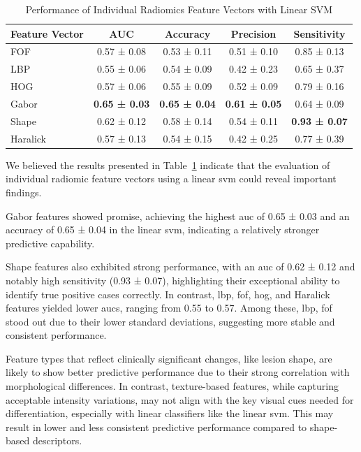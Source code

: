\begin{table}[ht]
    \centering
    \caption{Performance of Individual Radiomics Feature Vectors with Linear SVM}
    \label{tab:svm_feature_vectors}
    \begin{tabular}{lcccc}
        \toprule
        \textbf{Feature Vector} & \textbf{AUC} & \textbf{Accuracy} & \textbf{Precision} & \textbf{Sensitivity} \\
        \midrule
        FOF             & 0.57 ± 0.08 & 0.53 ± 0.11 & 0.51 ± 0.10 & 0.85 ± 0.13 \\
        LBP             & 0.55 ± 0.06 & 0.54 ± 0.09	& 0.42 ± 0.23 	& 0.65 ± 0.37 \\
        HOG             & 0.57 ± 0.06 & 0.55 ± 0.09 & 0.52 ± 0.09 & 0.79 ± 0.16 \\
        Gabor           & \textbf{0.65 ± 0.03} & \textbf{0.65 ± 0.04} & \textbf{0.61 ± 0.05} & 0.64 ± 0.09 \\
        Shape        & 0.62 ± 0.12 & 0.58 ± 0.14	& 0.54 ± 0.11	& \textbf{0.93 ± 0.07} \\
        Haralick        & 0.57 ± 0.13 & 0.54 ± 0.15	& 0.42 ± 0.25	& 0.77 ± 0.39 \\
        \bottomrule
    \end{tabular}
\end{table}

We believed the results presented in Table~\ref{tab:svm_feature_vectors} indicate that the evaluation of individual radiomic feature vectors using a linear \ac{svm} could reveal important findings.

Gabor features showed promise, achieving the highest \ac{auc} of 0.65 ± 0.03 and an accuracy of 0.65 ± 0.04 in the linear \ac{svm}, indicating a relatively stronger predictive capability.

Shape features also exhibited strong performance, with an \ac{auc} of 0.62 ± 0.12 and notably high sensitivity (0.93 ± 0.07), highlighting their exceptional ability to identify true positive cases correctly.
In contrast, \ac{lbp}, \ac{fof}, \ac{hog}, and Haralick features yielded lower \acp{auc}, ranging from 0.55 to 0.57. Among these, \ac{lbp}, \ac{fof} stood out due to their lower standard deviations, suggesting more stable and consistent performance. 

Feature types that reflect clinically significant changes, like lesion shape, are likely to show better predictive performance due to their strong correlation with morphological differences. In contrast, texture-based features, while capturing acceptable intensity variations, may not align with the key visual cues needed for differentiation, especially with linear classifiers like the linear \ac{svm}. This may result in lower and less consistent predictive performance compared to shape-based descriptors.

